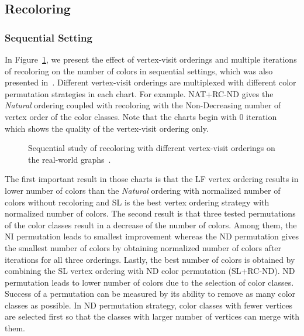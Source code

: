 \documentclass{article}
\begin{document}
\subsection{Recoloring}
\label{subsec:recoloring}

\subsubsection{Sequential Setting}
\label{subsubsec:seq}

In Figure~\ref{fig:seq_study}, we present the effect of vertex-visit orderings and
multiple iterations of recoloring on the number of colors in sequential settings, which
was also presented in~\cite{HiPC11}. Different vertex-visit orderings are multiplexed
with different color permutation strategies in each chart. For example. NAT+RC-ND gives
the {\em Natural} ordering coupled with recoloring with the Non-Decreasing number of
vertex order of the color classes. Note that the charts begin with
0 iteration which shows the quality of the vertex-visit ordering only.

\begin{figure}[bt]
  \centering
  \caption{Sequential study of recoloring with different vertex-visit orderings on the real-world graphs~\cite{HiPC11}.}
  \label{fig:seq_study}
\end{figure}


The first important result in those charts is that the LF vertex ordering results in
lower number of colors than the {\em Natural} ordering with  normalized number of
colors without recoloring and SL is the best vertex ordering strategy with  normalized
number of colors. The second result is that three tested permutations of the color
classes result in a decrease of the number of colors. Among them, the NI permutation
leads to smallest improvement whereas the ND permutation gives the smallest number of colors
by obtaining  normalized number of colors after  iterations for all three orderings.
Lastly, the best number of colors is obtained by combining the SL vertex ordering with
ND color permutation (SL+RC-ND). ND permutation leads to lower number of colors due to
the selection of color classes. Success of a permutation can be measured by its ability to
remove as many color classes as possible. In ND permutation strategy, color classes with
fewer vertices are selected first so that the classes with larger number of vertices 
can merge with them. 
\end{document}
